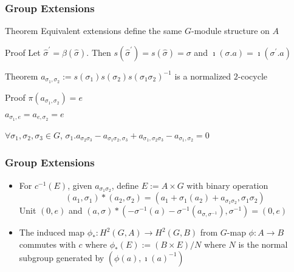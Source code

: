 \documentclass[10pt,xcolor=table,dvipsnames]{beamer}
\newenvironment{stepitemize}{\begin{itemize}[<+->]}{\end{itemize} }
\begin{document}
\begin{frame}
\frametitle{Group Extensions}
\begin{block}{Theorem}%
Equivalent extensions define the same $G$-module structure on $A$
\end{block}

\begin{block}{Proof}%
Let $\widehat{\sigma }^{\prime }=\beta \left( \widehat{\sigma }\right) $.
Then $s\left( \widehat{\sigma }^{\prime }\right) =s\left( \widehat{\sigma }%
\right) =\sigma $ and $\imath \left( \sigma .a\right) =\imath \left( \sigma
^{\prime }.a\right) $
\end{block}

\begin{block}{Theorem}%
$a_{\sigma _{1},\sigma _{2}}:=s\left( \sigma _{1}\right) s\left( \sigma
_{2}\right) s\left( \sigma _{1}\sigma _{2}\right) ^{-1}$ is a normalized $2$-cocycle
\end{block}

\begin{block}{Proof}%
$\pi \left(
a_{\sigma _{1},\sigma _{2}}\right) =e$

$a_{\sigma _{1},e}=a_{e,\sigma _{2}}=e$

$\forall \sigma _{1},\sigma _{2},\sigma _{3} \in G$, $\sigma _{1}.a_{\sigma
_{2}\sigma _{3}}-a_{\sigma _{1}\sigma _{2},\sigma _{3}}+a_{\sigma
_{1},\sigma _{2}\sigma _{3}}-a_{\sigma _{1},\sigma _{2}}=0$


\end{block}

\end{frame}

\begin{frame}
\frametitle{Group Extensions}
\begin{stepitemize}
\item For $c^{-1}\left( E\right) $, given $a_{\sigma _{1}\sigma _{2}}$, define $%
E:=A\times G$ with binary operation
\begin{equation*}
\left( a_{1},\sigma _{1}\right) \ast \left( a_{2},\sigma _{2}\right) =\left(
a_{1}+\sigma _{1}\left( a_{2}\right) +a_{\sigma _{1}\sigma _{2}},\sigma
_{1}\sigma _{2}\right)
\end{equation*}%
Unit $\left( 0,e\right) $ and $\left( a,\sigma \right) \ast \left( -\sigma
^{-1}\left( a\right) -\sigma ^{-1}\left( a_{\sigma ,\sigma ^{-1}}\right)
,\sigma ^{-1}\right) =\left( 0,e\right) $

\item The induced map $\phi _{\ast }:H^{2}\left( G,A\right) \longrightarrow
H^{2}\left( G,B\right) $ from $G$-map $\phi :A\longrightarrow B$ commutes
with $c$ where $\phi _{\ast }\left( E\right) :=\left( B\times E\right) /N$
where $N$ is the normal subgroup generated by $\left( \phi \left( a\right)
,\imath \left( a\right) ^{-1}\right) $
\end{stepitemize}

\end{frame}
\end{document}
